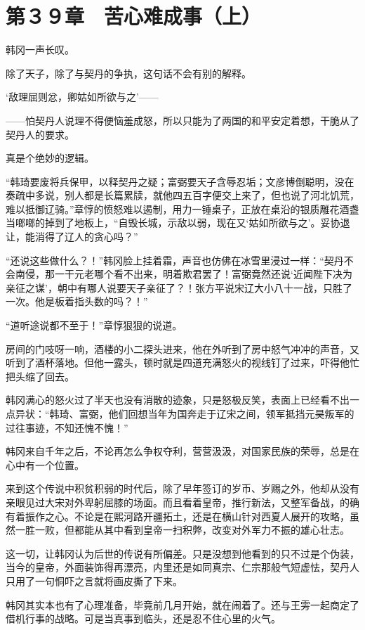 \section{第３９章　苦心难成事（上）}

韩冈一声长叹。

除了天子，除了与契丹的争执，这句话不会有别的解释。

‘敌理屈则忿，卿姑如所欲与之’——

——怕契丹人说理不得便恼羞成怒，所以只能为了两国的和平安定着想，干脆从了契丹人的要求。

真是个绝妙的逻辑。

“韩琦要废将兵保甲，以释契丹之疑；富弼要天子含辱忍垢；文彦博倒聪明，没在奏疏中多说，别人都是长篇累牍，就他四五百字便交上来了，但也说了河北饥荒，难以抵御辽骑。”章惇的愤怒难以遏制，用力一锤桌子，正放在桌沿的银质雕花酒盏当啷啷的掉到了地板上，“自毁长城，示敌以弱，现在又‘姑如所欲与之’。妥协退让，能消得了辽人的贪心吗？”

“还说这些做什么？！”韩冈脸上挂着霜，声音也仿佛在冰雪里浸过一样：“契丹不会南侵，那一干元老哪个看不出来，明着欺君罢了！富弼竟然还说‘近闻陛下决为亲征之谋’，朝中有哪人说要天子亲征了？！张方平说宋辽大小八十一战，只胜了一次。他是板着指头数的吗？！”

“道听途说都不至于！”章惇狠狠的说道。

房间的门吱呀一响，酒楼的小二探头进来，他在外听到了房中怒气冲冲的声音，又听到了酒杯落地。但他一露头，顿时就是四道充满怒火的视线钉了过来，吓得他忙把头缩了回去。

韩冈满心的怒火过了半天也没有消散的迹象，只是怒极反笑，表面上已经看不出一点异状：“韩琦、富弼，他们回想当年为国奔走于辽宋之间，领军抵挡元昊叛军的过往事迹，不知还愧不愧！”

韩冈来自千年之后，不论再怎么争权夺利，营营汲汲，对国家民族的荣辱，总是在心中有一个位置。

来到这个传说中积贫积弱的时代后，除了早年签订的岁币、岁赐之外，他却从没有亲眼见过大宋对外卑躬屈膝的场面。而且看着皇帝，推行新法，又整军备战，的确有着振作之心。不论是在熙河路开疆拓土，还是在横山针对西夏人展开的攻略，虽然一胜一败，但都能从其中看到皇帝一扫积弊，改变对外军力不振的雄心壮志。

这一切，让韩冈认为后世的传说有所偏差。只是没想到他看到的只不过是个伪装，当今的皇帝，外面装饰得再漂亮，内里还是如同真宗、仁宗那般气短虚怯，契丹人只用了一句恫吓之言就将画皮撕了下来。

韩冈其实本也有了心理准备，毕竟前几月开始，就在闹着了。还与王雱一起商定了借机行事的战略。可是当真事到临头，还是忍不住心里的火气。

